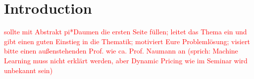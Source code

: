 \section{Introduction} \textcolor{red}{sollte mit Abstrakt pi*Daumen die ersten Seite füllen; leitet das Thema ein und gibt einen guten Einstieg in die Thematik; motiviert Eure Problemlösung; visiert bitte einen außenstehenden Prof. wie ca. Prof. Naumann an (sprich: Machine Learning muss nicht erklärt werden, aber Dynamic Pricing wie im Seminar wird unbekannt sein)}
